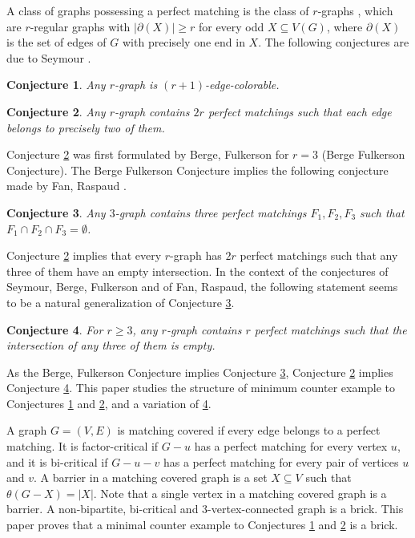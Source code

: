 \documentclass[fleqn,12pt]{article}
\newtheorem{conjecture}{Conjecture}
\begin{document}
A class of graphs possessing a perfect matching is the class of $r$-graphs \cite{Seymour_1979}, which are $r$-regular graphs with  $|\partial(X)|\geq r$ for every odd $X\subseteq V(G)$, 
where $\partial(X)$ is the set of edges of $G$ with precisely one end in $X$. The following conjectures are due to Seymour \cite{Seymour_1979}.


\begin{conjecture}\label{SeymourColoring} Any $r$-graph is $(r+1)$-edge-colorable.
\end{conjecture}

\begin{conjecture}\label{SeymourPerfects} Any $r$-graph contains $2r$ perfect matchings such that each edge belongs to precisely two of them.
\end{conjecture}

Conjecture \ref{SeymourPerfects} was first formulated by Berge, Fulkerson for $r=3$ (Berge Fulkerson Conjecture).  
The Berge Fulkerson Conjecture implies the following conjecture made by Fan, Raspaud \cite{FanRaspaud}.

\begin{conjecture}\label{FanRaspaud} Any $3$-graph contains three perfect matchings $F_1,F_2,F_3$ such that $F_1\cap F_2 \cap F_3=\emptyset$.
\end{conjecture}

Conjecture \ref{SeymourPerfects} implies that every $r$-graph has $2r$ perfect matchings such that any three of them have an empty intersection. In the context of the conjectures
of Seymour, Berge, Fulkerson and of Fan, Raspaud, the following statement seems to be a natural generalization of Conjecture \ref{FanRaspaud}.

\begin{conjecture}\label{FanRaspaud_r} For $r \geq 3$, any $r$-graph contains $r$ perfect matchings such that the intersection of any three of them is empty.
\end{conjecture}

As the Berge, Fulkerson Conjecture implies Conjecture \ref{FanRaspaud}, Conjecture \ref{SeymourPerfects} implies Conjecture \ref{FanRaspaud_r}.
This paper studies the structure of minimum counter example to Conjectures \ref{SeymourColoring} and \ref{SeymourPerfects}, 
and a variation of \ref{FanRaspaud_r}.

A graph $G=(V,E)$ is matching covered if every edge belongs to a perfect matching. It is factor-critical if $G-u$ has a perfect matching for every vertex $u$, and it 
is bi-critical if $G-u-v$ has a perfect matching for every pair of vertices $u$ and $v$.  A barrier in a matching covered graph is a set $X \subseteq V$
such that $\theta(G-X) = |X|$. Note that a single vertex in a matching covered graph is a barrier. A non-bipartite, bi-critical and $3$-vertex-connected graph is a brick. 
This paper proves that a minimal counter example to Conjectures \ref{SeymourColoring} and \ref{SeymourPerfects} is a brick. 
\end{document}
